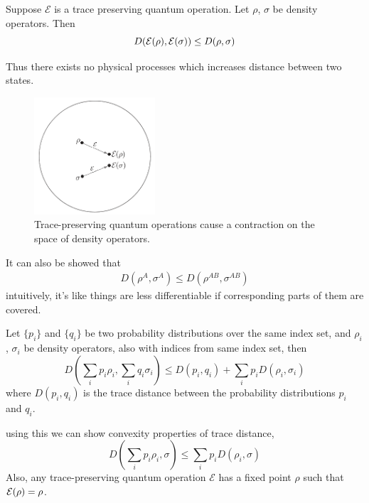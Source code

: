 \begin{theorem}
    Suppose $\mathcal{E}$ is a trace preserving quantum operation. Let $\rho$, $\sigma$ be density operators. Then
    \begin{equation}
        D(\operatorname{\mathcal{E}}(\rho), \operatorname{\mathcal{E}}(\sigma)) \leq D(\rho, \sigma)
    \end{equation}
\end{theorem}
Thus there exists no physical processes which increases distance between two states.
\begin{figure}[H]
    \centering
    \includegraphics[width=0.4\textwidth]{images/contraction_due_to_operation.png}
    \caption{Trace-preserving quantum operations cause a contraction on the space of density operators.}
    \label{fig:enter-label}
\end{figure}

It can also be showed that
\begin{align}
    D(\rho^A, \sigma^A) \leq D(\rho^{AB}, \sigma^{AB})
\end{align}
intuitively, it's  like things are less differentiable if corresponding parts of them are covered.

\begin{theorem}
    Let $\{ p_i \}$ and $\{ q_i \}$ be two probability distributions over the same index set, and $\rho_i$, $\sigma_i$ be density operators, also with indices from same index set, then
    \begin{equation}
        D\left( \sum_i p_i\rho_i, \sum_i q_i\sigma_i \right)
        \leq
        D(p_i, q_i) +
        \sum_i p_i D(\rho_i, \sigma_i)
    \end{equation}
    where $D(p_i, q_i)$ is the trace distance between the probability distributions $p_i$ and $q_i$.
\end{theorem}
using this we can show convexity properties of trace distance,
\begin{equation}
    D\left( \sum_i p_i\rho_i , \sigma \right)
    \leq
    \sum_i p_iD(\rho_i, \sigma)
\end{equation}
Also, any trace-preserving quantum operation $\mathcal{E}$ has a fixed point $\rho$ such that $\operatorname{\mathcal{E}}(\rho) = \rho$.

